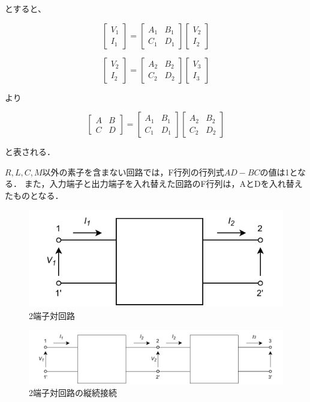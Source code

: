 とすると、

$$
\left[\begin{array}{l}
V_1 \\
I_1
\end{array}\right]=\left[\begin{array}{ll}
A_1 & B_1 \\
C_1 & D_1
\end{array}\right]\left[\begin{array}{l}
V_2 \\
I_2
\end{array}\right]
$$

$$
\left[\begin{array}{c}
V_2 \\
I_2
\end{array}\right]=\left[\begin{array}{ll}
A_2 & B_2 \\
C_2 & D_2
\end{array}\right]\left[\begin{array}{l}
V_3 \\
I_3
\end{array}\right]
$$

より

$$
\left[\begin{array}{ll}
A & B \\
C & D
\end{array}\right]=\left[\begin{array}{ll}
A_1 & B_1 \\
C_1 & D_1
\end{array}\right]\left[\begin{array}{ll}
A_2 & B_2 \\
C_2 & D_2
\end{array}\right]
$$

と表される．


$R,L,C,M$以外の素子を含まない回路では，F行列の行列式$AD-BC$の値は1となる．
また，入力端子と出力端子を入れ替えた回路のF行列は，AとDを入れ替えたものとなる．

\begin{figure}
    \begin{center}
        \includegraphics[]{figure1.drawio.pdf}
        \caption{2端子対回路}
    \end{center}
\end{figure}

\begin{figure}
    \begin{center}
        \includegraphics[]{figure2.drawio.pdf}
        \caption{2端子対回路の縦続接続}
    \end{center}
\end{figure}
